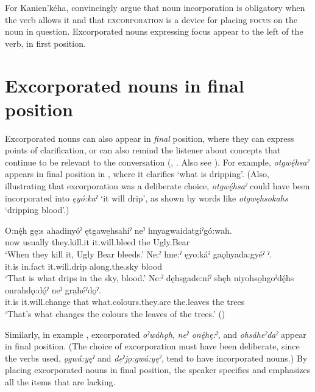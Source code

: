  

For Kanien'kéha, \citet[2,8]{decaire_2017} convincingly argue that noun incorporation is obligatory when the verb allows it and that \textsc{excorporation} is a device for placing \textsc{focus} on the noun in question. Excorporated nouns expressing focus appear to the left of the verb, in first position.

\section{Excorporated nouns in final position} \label{ch:Non-incorporated nouns in final position}
Excorporated nouns can also appear in \emph{final} position, where they can express points of clarification, or can also remind the listener about concepts that continue to be relevant to the conversation (\cite{li_givenness_1976}, \cite[199--200]{mithun_languages_1999}. Also see ). For example, \textit{otgwę́hsaˀ} appears in final position in , where it clarifies ‘what is dripping’. (Also, illustrating that excorporation was a deliberate choice, \textit{otgwę́hsaˀ} could have been incorporated into \textit{ęyó:kaˀ} ‘it will drip’, as shown by words like \textit{otgwęhsokahs} ‘dripping blood’.)

\ea\label{ex:nounincdiscex4}
\ea\label{ex:nounincdiscex4a} 
\gll O:nę́h gę:s ahadinyóˀ ętgawe̱hsahíˀ neˀ hnyagwaidatgiˀgó:wah.\\
now usually they.kill.it it.will.bleed the Ugly.Bear\\
\glt ‘When they kill it, Ugly Bear bleeds.’
\ex \label{ex:nounincdiscex4b}
\gll Ne:ˀ hne:ˀ ęyo:káˀ gaǫhyada:gyéˀ ˀ. \\
it.is in.fact it.will.drip along.the.sky blood \\
\glt ‘That is what drips in the sky, blood.’
\ex 
\gll Ne:ˀ dęhsgade:níˀ shęh niyohso̱hgoˀdę́hs onrahdǫ:dǫ́ˀ neˀ gra̱héˀdǫˀ.\\
it.is it.will.change that what.colours.they.are the.leaves the trees\\
\glt ‘That’s what changes the colours the leaves of the trees.’ (\cite{keye_hnyagwaidatgigowah_2012})
\z
\z 

Similarly, in example , excorporated \textit{oˀwáhǫh}, \textit{neˀ onę́hę:ˀ}, and \textit{ohsáheˀdaˀ} appear in final position. (The choice of excorporation must have been deliberate, since the verbs used, \textit{ǫgwá:yęˀ} and \textit{de̱ˀjǫ:gwá:yęˀ,} tend to have incorporated nouns.) By placing excorporated nouns in final position, the speaker specifies and emphasizes all the items that are lacking.

